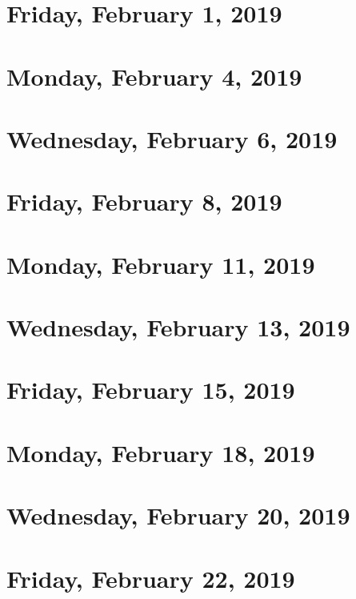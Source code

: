 \documentclass[reqno]{amsart}
\begin{document}
\section{Friday, February 1, 2019}
    

\section{Monday, February 4, 2019}
    
    
\section{Wednesday, February 6, 2019}
    

\section{Friday, February 8, 2019}
    
    
\section{Monday, February 11, 2019}
    
    
\section{Wednesday, February 13, 2019}
    

\section{Friday, February 15, 2019}
    

\section{Monday, February 18, 2019}
    
    
\section{Wednesday, February 20, 2019}
    

\section{Friday, February 22, 2019}
    
\end{document}
